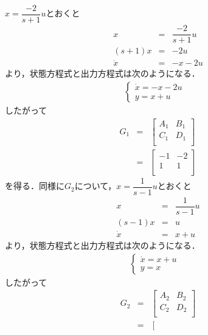 \documentclass[a4paper,11pt]{jarticle}
\begin{document}
\begin{enumerate}
       $ x = \dfrac{-2}{s+1}u $とおくと
       \begin{eqnarray*}
	x & = & \dfrac{-2}{s+1} u\\
	(s + 1)x & = & -2u\\
	\dot{x} & = & -x -2u
       \end{eqnarray*}
       より，状態方程式と出力方程式は次のようになる．
       \begin{eqnarray}
       	\begin{cases}
       	 \dot{x} = -x -2u & \\
       	 y = x + u &
       	\end{cases}
       \end{eqnarray}
       したがって
       \begin{eqnarray}
	G_1 & = & \left[
		   \begin{array}{c|c}
		    A_1 & B_1 \\ \hline
		     C_1 & D_1 \\
		   \end{array}\right] \nonumber \\
	    & = & \left[
		   \begin{array}{c|c}
		    -1 & -2 \\ \hline
		     1 & 1 \\
		   \end{array}\right]
       \end{eqnarray}
       を得る．同様に$ G_2 $について，$ x = \dfrac{1}{s-1}u $とおくと
       \begin{eqnarray*}
	x & = & \dfrac{1}{s-1}u\\
	(s-1)x & = & u\\
	\dot{x} & = & x + u
       \end{eqnarray*}
       より，状態方程式と出力方程式は次のようになる．
       \begin{eqnarray}
	\begin{cases}
	 \dot{x} = x + u &\\
	 y = x &
	\end{cases}
       \end{eqnarray}
       したがって
       \begin{eqnarray}
	G_2 & = & \left[
		  \begin{array}{c|c}
		   A_2 & B_2 \\ \hline
		   C_2 & D_2 \\
		  \end{array}\right] \nonumber \\
	    & = & \left[
		  \begin{array}{c|c}

\end{array}
\end{eqnarray}
\end{enumerate}
\end{document}
